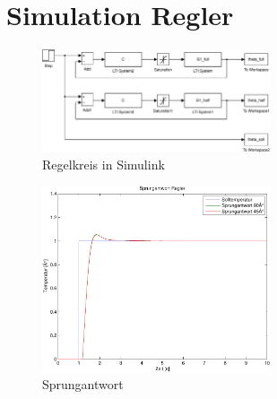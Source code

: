 \section{Simulation Regler}
\begin{figure}[h!]
    \centering
    \includegraphics[width=0.6\textwidth]{08/saturation_mdl.pdf}
    \caption{Regelkreis in Simulink}
    \label{fig:08simulink}
\end{figure}
\begin{figure}[h!]
    \centering
    \includegraphics[width=0.6\textwidth]{08/saturation_plot.pdf}
    \caption{Sprungantwort}
    \label{fig:08plot}
\end{figure}


